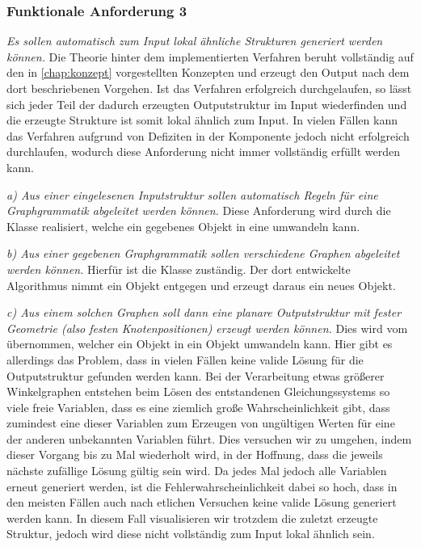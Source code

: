 \subsubsection{Funktionale Anforderung 3}
\textit{Es sollen automatisch zum Input lokal ähnliche Strukturen generiert werden können.} Die Theorie hinter dem implementierten Verfahren beruht
vollständig auf den in \autoref{chap:konzept} vorgestellten Konzepten und erzeugt den Output nach dem dort beschriebenen Vorgehen. Ist das Verfahren
erfolgreich durchgelaufen, so lässt sich jeder Teil der dadurch erzeugten Outputstruktur im Input wiederfinden und die erzeugte Strukture ist somit
lokal ähnlich zum Input. In vielen Fällen kann das Verfahren aufgrund von Defiziten in der  Komponente jedoch nicht erfolgreich durchlaufen,
wodurch diese Anforderung nicht immer vollständig erfüllt werden kann.

\textit{a) Aus einer eingelesenen Inputstruktur sollen automatisch Regeln für eine Graphgrammatik abgeleitet werden können.} Diese Anforderung wird
durch die Klasse  realisiert, welche ein gegebenes  Objekt in eine  umwandeln kann.

\textit{b) Aus einer gegebenen Graphgrammatik sollen verschiedene Graphen abgeleitet werden können.} Hierfür ist die  Klasse zuständig.
Der dort entwickelte Algorithmus nimmt ein  Objekt entgegen und erzeugt daraus ein neues  Objekt.

\textit{c) Aus einem solchen Graphen soll dann eine planare Outputstruktur mit fester Geometrie (also festen Knotenpositionen) erzeugt werden können.}
Dies wird vom  übernommen, welcher ein  Objekt in ein  Objekt umwandeln kann. Hier gibt es allerdings
das Problem, dass in vielen Fällen keine valide Lösung für die Outputstruktur gefunden werden kann. Bei der Verarbeitung etwas größerer Winkelgraphen
entstehen beim Lösen des entstandenen Gleichungssystems so viele freie Variablen, dass es eine ziemlich große Wahrscheinlichkeit gibt, dass zumindest
eine dieser Variablen zum Erzeugen von ungültigen Werten für eine der anderen unbekannten Variablen führt. Dies versuchen wir zu umgehen, indem
dieser Vorgang bis zu  Mal wiederholt wird, in der Hoffnung, dass die jeweils nächste zufällige Lösung gültig sein wird. Da jedes Mal
jedoch alle Variablen erneut generiert werden, ist die Fehlerwahrscheinlichkeit dabei so hoch, dass in den meisten Fällen auch nach etlichen Versuchen
keine valide Lösung generiert werden kann. In diesem Fall visualisieren wir trotzdem die zuletzt erzeugte Struktur, jedoch wird diese nicht vollständig
zum Input lokal ähnlich sein.

